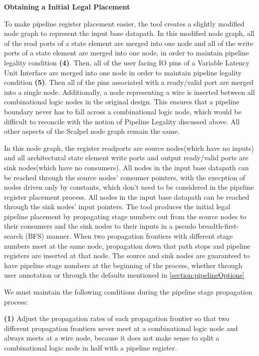 {\bf Obtaining a Initial Legal Placement}

To make pipeline register placement easier, the tool creates a slightly modified node graph to represent the input base datapath. In this modified node graph, all of the read ports of a state element are merged into one node and all of the write ports of a state element are merged into one node, in order to maintain pipeline legality condition {\bf (4)}. Then, all of the user facing IO pins of a Variable Latency Unit Interface are merged into one node in order to maintain pipeline legality condition {\bf (5)}. Then all of the pins associated with a ready/valid port are merged into a single node. Additionally, a node representing a wire is inserted between all combinational logic nodes in the original design. This ensures that a pipeline boundary never has to fall across a combinational logic node, which would be difficult to reconcile with the notion of Pipeline Legality discussed above. All other aspects of the Scalpel node graph remain the same.

In this node graph, the register readports are source nodes(which have no inputs) and all architectural state element write ports and output ready/valid ports are sink nodes(which have no consumers). All nodes in the input base datapath can be reached through the source nodes' consumer pointers, with the execption of nodes driven only by constants, which don't need to be considered in the pipeline register placement process. All nodes in the input base datapath can be reached through the sink nodes' input pointers. The tool produces the initial legal pipeline placement by propagating stage numbers out from the source nodes to their consumers and the sink nodes to their inputs in a pseudo breadth-first-search (BFS) manner. When two propagation frontiers with different stage numbers meet at the same node, propagation down that path stops and pipeline registers are inserted at that node. The source and sink nodes are guaranteed to have pipeline stage numbers at the beginning of the process, whether through user annotation or through the defaults mentioned in \ref{section:pipelineOptions}

We must maintain the following conditions during the pipeline stage propagation process:

{\bf (1)} Adjust the propagation rates of each propagation frontier so that two different propagation frontiers never meet at a combinational logic node and always meets at a wire node, because it does not make sense to split a combinational logic node in half with a pipeline register.

